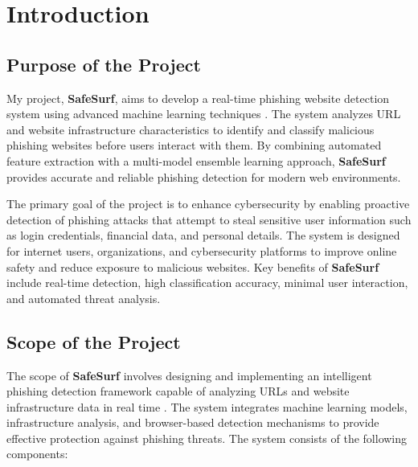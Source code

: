 \chapter{Introduction}

\section{Purpose of the Project}

My project, \textbf{SafeSurf}, aims to develop a real-time phishing website detection system using advanced machine learning techniques \cite{ref1}. The system analyzes URL and website infrastructure characteristics to identify and classify malicious phishing websites before users interact with them. By combining automated feature extraction with a multi-model ensemble learning approach, \textbf{SafeSurf} provides accurate and reliable phishing detection for modern web environments.

The primary goal of the project is to enhance cybersecurity by enabling proactive detection of phishing attacks that attempt to steal sensitive user information such as login credentials, financial data, and personal details. The system is designed for internet users, organizations, and cybersecurity platforms to improve online safety and reduce exposure to malicious websites. Key benefits of \textbf{SafeSurf} include real-time detection, high classification accuracy, minimal user interaction, and automated threat analysis.

\section{Scope of the Project}

The scope of \textbf{SafeSurf} involves designing and implementing an intelligent phishing detection framework capable of analyzing URLs and website infrastructure data in real time \cite{ref2, ref3, ref4}. The system integrates machine learning models, infrastructure analysis, and browser-based detection mechanisms to provide effective protection against phishing threats.
The system consists of the following components:

